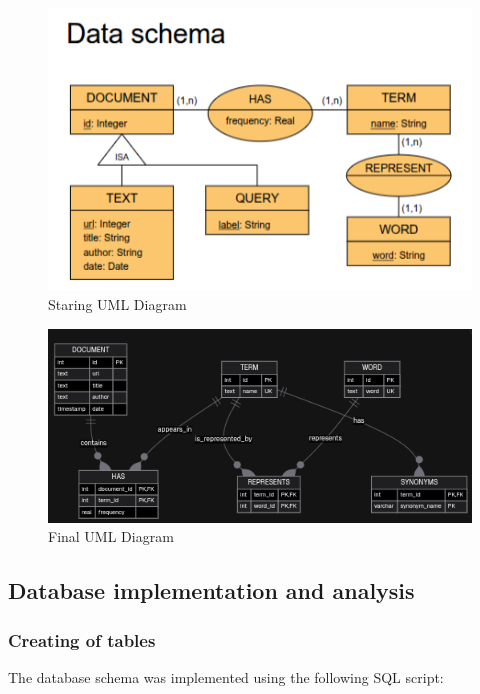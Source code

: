 \documentclass[twoside]{article}
\begin{document}
\begin{figure}[H]
  \centering
  \includegraphics[width=1\textwidth]{imgs/uml.png}
  \caption{Staring UML Diagram}
  \label{fig:3}
\end{figure}

\begin{figure}[H]
  \centering
  \includegraphics[width=1\textwidth]{imgs/uml2.png}
  \caption{Final UML Diagram}
  \label{fig:uml}
\end{figure}




\subsection{Database implementation and analysis}

\subsubsection{Creating of tables}
The database schema was implemented using the following SQL script:
\end{document}
